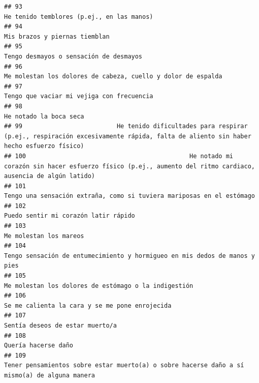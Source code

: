 \documentclass[
]{article}
\begin{document}
\begin{verbatim}
## 93                                                                                                                 He tenido temblores (p.ej., en las manos)
## 94                                                                                                                             Mis brazos y piernas tiemblan
## 95                                                                                                                    Tengo desmayos o sensación de desmayos
## 96                                                                                              Me molestan los dolores de cabeza, cuello y dolor de espalda
## 97                                                                                                                 Tengo que vaciar mi vejiga con frecuencia
## 98                                                                                                                                    He notado la boca seca
## 99                          He tenido dificultades para respirar (p.ej., respiración excesivamente rápida, falta de aliento sin haber hecho esfuerzo físico)
## 100                                             He notado mi corazón sin hacer esfuerzo físico (p.ej., aumento del ritmo cardiaco, ausencia de algún latido)
## 101                                                                                    Tengo una sensación extraña, como si tuviera mariposas en el estómago
## 102                                                                                                                     Puedo sentir mi corazón latir rápido
## 103                                                                                                                                   Me molestan los mareos
## 104                                                                               Tengo sensación de entumecimiento y hormigueo en mis dedos de manos y pies
## 105                                                                                                     Me molestan los dolores de estómago o la indigestión
## 106                                                                                                           Se me calienta la cara y se me pone enrojecida
## 107                                                                                                                          Sentía deseos de estar muerto/a
## 108                                                                                                                                      Quería hacerse daño
## 109                                                             Tener pensamientos sobre estar muerto(a) o sobre hacerse daño a sí mismo(a) de alguna manera

\end{verbatim}
\end{document}
